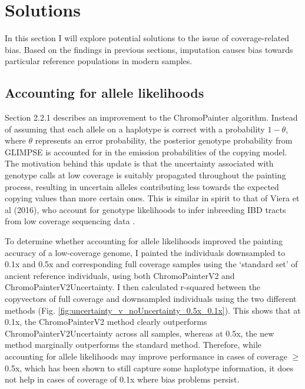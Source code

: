 \section{Solutions}

In this section I will explore potential solutions to the issue of coverage-related bias. Based on the findings in previous sections, imputation causes bias towards particular reference populations in modern samples.  

\subsection{Accounting for allele likelihoods}

Section 2.2.1 describes an improvement to the ChromoPainter algorithm. Instead of assuming that each allele on a haplotype is correct with a probability $1-\theta$, where $\theta$ represents an error probability, the posterior genotype probability from GLIMPSE is accounted for in the emission probabilities of the copying model. The motivation behind this update is that the uncertainty associated with genotype calls at low coverage is suitably propagated throughout the painting process, resulting in uncertain alleles contributing less towards the expected copying values than more certain ones. This is similar in spirit to that of Viera et al (2016), who account for genotype likelihoods to infer inbreeding IBD tracts from low coverage sequencing data \cite{vieira2016estimating}.

To determine whether accounting for allele likelihoods improved the painting accuracy of a low-coverage genome, I painted the individuals downsampled to 0.1x and 0.5x and corresponding full coverage samples using the `standard set' of ancient reference individuals, using both ChromoPainterV2 and ChromoPainterV2Uncertainty. I then calculated r-squared between the copyvectors of full coverage and downsampled individuals using the two different methods (Fig. \ref{fig:uncertainty_v_noUncertainty_0.5x_0.1x}). This shows that at 0.1x, the ChromoPainterV2 method clearly outperforms ChromoPainterV2Uncertainty across all samples, whereas at 0.5x, the new method marginally outperforms the standard method. Therefore, while accounting for allele likelihoods may improve performance in cases of coverage $\geq$0.5x, which has been shown to still capture some haplotype information, it does not help in cases of coverage of 0.1x where bias problems persist.


